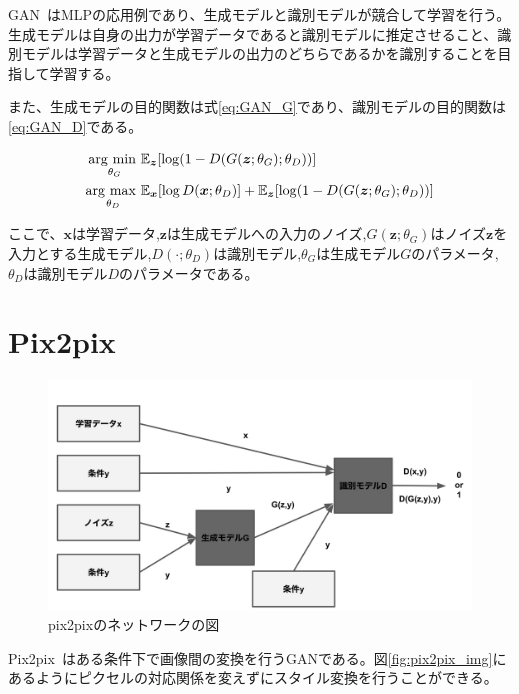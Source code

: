 GAN~\cite{GAN}はMLPの応用例であり、生成モデルと識別モデルが競合して学習を行う。生成モデルは自身の出力が学習データであると識別モデルに推定させること、識別モデルは学習データと生成モデルの出力のどちらであるかを識別することを目指して学習する。

また、生成モデルの目的関数は式\ref{eq:GAN_G}であり、識別モデルの目的関数は\ref{eq:GAN_D}である。

\begin{align}
    \label{eq:GAN_G}
    \mathop{\rm arg~min~}\limits _{\theta_G}& \mathbb{E}_{\boldsymbol{z}}[\log (1-D(G(\boldsymbol{z};\theta_G);\theta_D))]\\
    \label{eq:GAN_D}
    \mathop{\rm arg~max~}\limits _{\theta_D}& \mathbb{E}_{\boldsymbol{x}}[\log D(\boldsymbol{x};\theta_D)]+\mathbb{E}_{\boldsymbol{z}}[\log (1-D(G(\boldsymbol{z};\theta_G);\theta_D))]
\end{align}

ここで、$\boldsymbol{x}$は学習データ,$\boldsymbol{z}$は生成モデルへの入力のノイズ,$G(\boldsymbol{z};\theta_G)$はノイズ$\boldsymbol{z}$を入力とする生成モデル,$D(\cdot;\theta_D)$は識別モデル,$\theta_G$は生成モデル$G$のパラメータ,$\theta_D$は識別モデル$D$のパラメータである。



\section{Pix2pix}

\begin{figure}[t]
\begin{center}
\includegraphics[width=\hsize]{figure/pix2pix_net.png}
\caption{pix2pixのネットワークの図}
\label{fig:pix2pix_net}
\end{center}
\end{figure}

Pix2pix~\cite{pix2pix}はある条件下で画像間の変換を行うGANである。図\ref{fig:pix2pix_img}にあるようにピクセルの対応関係を変えずにスタイル変換を行うことができる。

